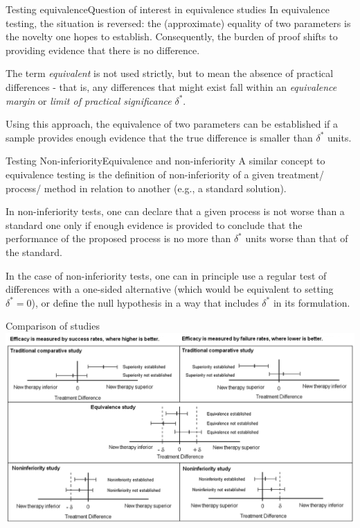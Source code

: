 \begin{frame}{Testing equivalence}{Question of interest in equivalence studies}
In equivalence testing, the situation is reversed: the (approximate) equality of two parameters is the novelty one hopes to establish. Consequently, the burden of proof shifts to providing evidence that there is no difference.
\bigskip

The term \textit{equivalent} is not used strictly, but to mean the absence of practical differences - that is, any differences that might exist fall within an \textit{equivalence margin} or \textit{limit of practical significance} $\delta^*$.
\bigskip

Using this approach, the equivalence of two parameters can be established if a sample provides enough evidence that the true difference is smaller than $\delta^*$ units.
\end{frame}

\begin{frame}{Testing Non-inferiority}{Equivalence and non-inferiority}
A similar concept to equivalence testing is the definition of non-inferiority of a given treatment/ process/ method in relation to another (e.g., a standard solution).
\bigskip

In non-inferiority tests, one can declare that a given process is not worse than a standard one only if enough evidence is provided to conclude that the performance of the proposed process is no more than $\delta^*$ units worse than that of the standard.
\bigskip

In the case of non-inferiority tests, one can in principle use a regular test of differences with a one-sided alternative (which would be equivalent to setting $\delta^* = 0$), or define the null hypothesis in a way that includes $\delta^*$ in its formulation.
\end{frame}


\begin{frame}{Comparison of studies}
\includegraphics[width=\textwidth]{../img/TOST.png}
\end{frame}


